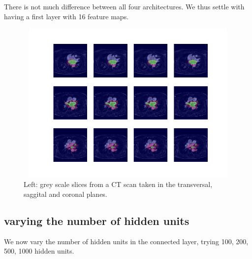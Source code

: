 \noindent There is not much difference between all four architectures. We thus settle with having a first layer with 16 feature maps.

\begin{figure}
\centering
\includegraphics[trim=2.5cm 1.5cm 2cm 1.5cm, clip=true, height=80mm, width=150mm]{Chapter3/mask_results_varying_number_of_feature_maps.png}
\caption{Left: grey scale slices from a CT scan taken in the transversal, saggital and coronal planes.}
\end{figure}

\subsection{varying the number of hidden units}

\noindent We now vary the number of hidden units in the connected layer, trying 100, 200, 500, 1000 hidden units. \\

